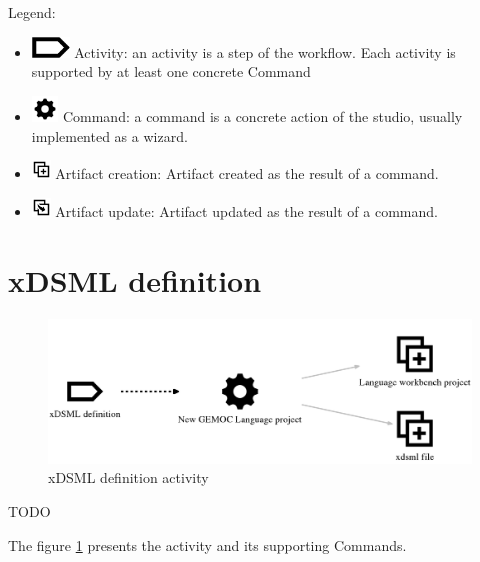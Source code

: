 \documentclass{gemoc} %
\begin{document}
Legend:
\begin{itemize}
	\item \includegraphics[width=1cm]{fig/step} Activity: an activity is a step of the workflow. Each activity is supported by at least one concrete Command
	\item \includegraphics[width=0.7cm]{fig/command} Command: a command is a concrete action of the studio, usually implemented as a wizard.
	\item \includegraphics[width=0.5cm]{fig/artifact_add} Artifact creation: Artifact created as the result of a command.
	\item \includegraphics[width=0.5cm]{fig/artifact_update} Artifact update:  Artifact updated as the result of a command.
\end{itemize}
\section{xDSML definition}
\label{sec:xDSML_definition}
\begin{figure}[h!]
		\center
		\includegraphics*[trim=0.0cm 0.0cm 0cm 0.0cm, clip=true]{fig/xDSML_definition}
		\caption{xDSML definition activity}
		\label{fig:xDSML_definition}
\end{figure}

TODO

The figure \ref{fig:xDSML_definition} presents the activity and its supporting Commands.
\end{document}
